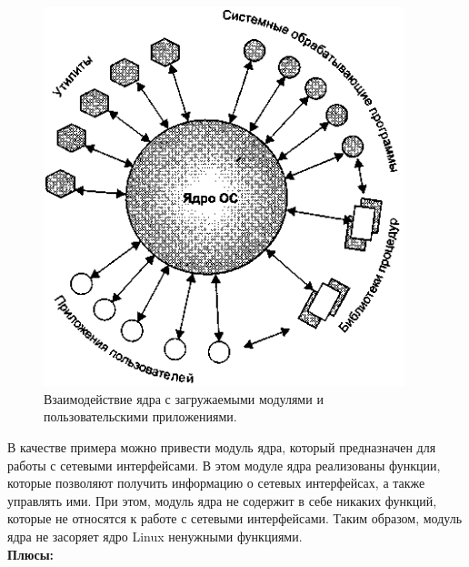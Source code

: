 \begin{figure}[H]
    \centering
    \includegraphics[width=105mm, scale=0.65]{inc/img/lkm}
    \caption{Взаимодействие ядра с загружаемыми модулями и пользовательскими приложениями.}
    \label{fig:lkm}
\end{figure}

В качестве примера можно привести модуль ядра, который предназначен для работы с сетевыми интерфейсами.
В этом модуле ядра реализованы функции, которые позволяют получить информацию о сетевых интерфейсах, а также управлять ими.
При этом, модуль ядра не содержит в себе никаких функций, которые не относятся к работе с сетевыми интерфейсами.
Таким образом, модуль ядра не засоряет ядро Linux ненужными функциями.
\vspace{1mm}\\
\textbf{Плюсы:}

